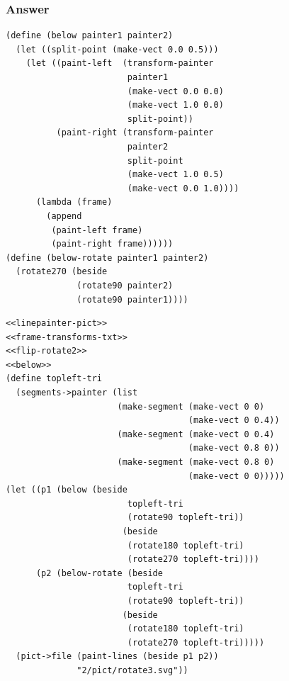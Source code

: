 \documentclass[final,fleqn,titlepage,twoside]{article}
\begin{document}
\subsubsection{Answer}
\label{sec:orgb02e269}
\begin{verbatim}
(define (below painter1 painter2)
  (let ((split-point (make-vect 0.0 0.5)))
    (let ((paint-left  (transform-painter 
                        painter1
                        (make-vect 0.0 0.0)
                        (make-vect 1.0 0.0)
                        split-point))
          (paint-right (transform-painter
                        painter2
                        split-point
                        (make-vect 1.0 0.5)
                        (make-vect 0.0 1.0))))
      (lambda (frame)
        (append
         (paint-left frame)
         (paint-right frame))))))
(define (below-rotate painter1 painter2)
  (rotate270 (beside
              (rotate90 painter2)
              (rotate90 painter1))))
\end{verbatim}

\begin{verbatim}
<<linepainter-pict>>
<<frame-transforms-txt>>
<<flip-rotate2>>
<<below>>
(define topleft-tri
  (segments->painter (list
                      (make-segment (make-vect 0 0)
                                    (make-vect 0 0.4))
                      (make-segment (make-vect 0 0.4)
                                    (make-vect 0.8 0))
                      (make-segment (make-vect 0.8 0)
                                    (make-vect 0 0)))))
(let ((p1 (below (beside
                        topleft-tri
                        (rotate90 topleft-tri))
                       (beside
                        (rotate180 topleft-tri)
                        (rotate270 topleft-tri))))
      (p2 (below-rotate (beside
                        topleft-tri
                        (rotate90 topleft-tri))
                       (beside
                        (rotate180 topleft-tri)
                        (rotate270 topleft-tri)))))
  (pict->file (paint-lines (beside p1 p2))
              "2/pict/rotate3.svg"))
\end{verbatim}
\end{document}
